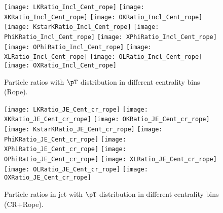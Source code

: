 \begin{figure}[ht]
        \begin{center}
                \texttt{[image: LKRatio\_Incl\_Cent\_rope]}
                \texttt{[image: XKRatio\_Incl\_Cent\_rope]}
                \texttt{[image: OKRatio\_Incl\_Cent\_rope]}
                \texttt{[image: KstarKRatio\_Incl\_Cent\_rope]}
                \texttt{[image: PhiKRatio\_Incl\_Cent\_rope]}
                \texttt{[image: XPhiRatio\_Incl\_Cent\_rope]}
                \texttt{[image: OPhiRatio\_Incl\_Cent\_rope]}
                \texttt{[image: XLRatio\_Incl\_Cent\_rope]}
                \texttt{[image: OLRatio\_Incl\_Cent\_rope]}
                \texttt{[image: OXRatio\_Incl\_Cent\_rope]}
        \end{center}
	\caption{Particle ratios with $\pT$ distribution in different centrality bins (Rope).}
        \label{fig:InclParRatioCentrope}
\end{figure}


\begin{figure}[ht]
        \begin{center}
                \texttt{[image: LKRatio\_JE\_Cent\_cr\_rope]}
                \texttt{[image: XKRatio\_JE\_Cent\_cr\_rope]}
                \texttt{[image: OKRatio\_JE\_Cent\_cr\_rope]}
                \texttt{[image: KstarKRatio\_JE\_Cent\_cr\_rope]}
                \texttt{[image: PhiKRatio\_JE\_Cent\_cr\_rope]}
                \texttt{[image: XPhiRatio\_JE\_Cent\_cr\_rope]}
                \texttt{[image: OPhiRatio\_JE\_Cent\_cr\_rope]}
                \texttt{[image: XLRatio\_JE\_Cent\_cr\_rope]}
                \texttt{[image: OLRatio\_JE\_Cent\_cr\_rope]}
                \texttt{[image: OXRatio\_JE\_Cent\_cr\_rope]}
        \end{center}
	\caption{Particle ratios in jet with $\pT$ distribution in different centrality bins (CR+Rope).}
        \label{fig:JEParRatioCentcrandrope}
\end{figure}

